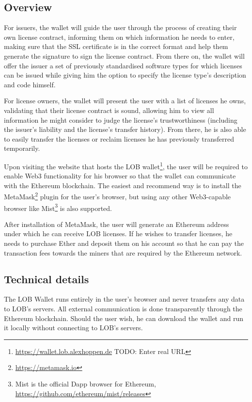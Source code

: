 \documentclass[a4paper]{article}
\newcommand{\todo}[1]{\textsf{TODO: #1}}
\begin{document}
\subsection{Overview}

For issuers, the wallet will guide the user through the process of creating their own license contract, informing them on which information he needs to enter, making sure that the SSL certificate is in the correct format and help them generate the signature to sign the license contract. From there on, the wallet will offer the issuer a set of previously standardised software types for which licenses can be issued while giving him the option to specify the license type's description and code himself.

For license owners, the wallet will present the user with a list of licenses he owns, validating that their license contract is sound, allowing him to view all information he might consider to judge the license's trustworthiness (including the issuer's liability and the license's transfer history). From there, he is also able to easily transfer the licenses or reclaim licenses he has previously transferred temporarily.

Upon visiting the website that hosts the LOB wallet\footnote{\url{https://wallet.lob.alexhoppen.de} \todo{Enter real URL}}, the user will be required to enable Web3 functionality for his browser so that the wallet can communicate with the Ethereum blockchain. The easiest and recommend way is to install the MetaMask\footnote{\url{https://metamask.io}} plugin for the user's browser, but using any other Web3-capable browser like Mist\footnote{Mist is the official Dapp browser for Ethereum, \url{https://github.com/ethereum/mist/releases}} is also supported.

After installation of MetaMask, the user will generate an Ethereum address under which he can receive LOB licenses. If he wishes to transfer licenses, he needs to purchase Ether and deposit them on his account so that he can pay the transaction fees towards the miners that are required by the Ethereum network.

\subsection{Technical details}

The LOB Wallet runs entirely in the user's browser and never transfers any data to LOB's servers. All external communication is done transparently through the Ethereum blockchain. Should the user wish, he can download the wallet and run it locally without connecting to LOB's servers. 
\end{document}
